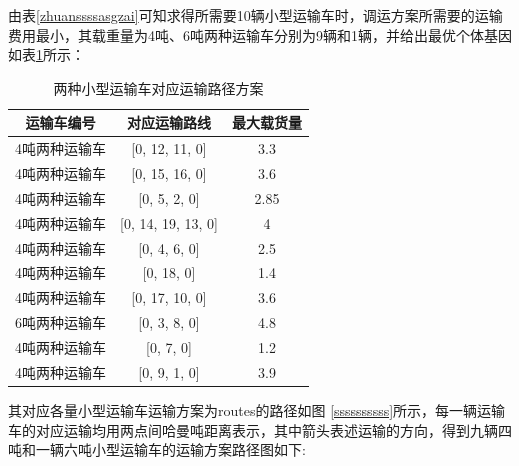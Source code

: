 \documentclass{whutmod}
\begin{document}
    由表\ref{zhuanssssasgzai}可知求得所需要10辆小型运输车时，调运方案所需要的运输费用最小，其载重量为4吨、6吨两种运输车分别为9辆和1辆，并给出最优个体基因如表\ref{zhuansssssassgzai}所示：
    
    

    \begin{table}[H]
    	
    	\centering		
    	\caption{两种小型运输车对应运输路径方案}\label{zhuansssssassgzai}
    	\begin{tabular}{ccc}
    		\toprule[2pt]
    		\multicolumn{1}{m{5cm}}{\centering 运输车编号}
    		& \multicolumn{1}{m{5cm}}{\centering 对应运输路线 }
    		&\multicolumn{1}{m{5cm}}{\centering 最大载货量}
    		\\
    		\midrule[1pt]
    		4吨两种运输车 & [0, 12, 11, 0]&3.3 \\ 
    		4吨两种运输车 &   [0, 15, 16, 0]& 3.6\\ 
    		4吨两种运输车 &  [0, 5, 2, 0]& 2.85\\ 
    		4吨两种运输车 &  [0, 14, 19, 13, 0]& 4\\ 
    		4吨两种运输车 &  [0, 4, 6, 0]&2.5\\ 
    		4吨两种运输车 &  [0, 18, 0] &1.4\\ 
    		4吨两种运输车 & [0, 17, 10, 0] &3.6\\ 
    		6吨两种运输车 &  [0, 3, 8, 0]&4.8\\ 
    		  4吨两种运输车 & [0, 7, 0]&1.2\\ 
    		4吨两种运输车 &   [0, 9, 1, 0]& 3.9\\ 
    		\bottomrule[2pt]	
    	\end{tabular}
    \end{table}
    
    其对应各量小型运输车运输方案为routes的路径如图 \ref{ssssssssss}所示，每一辆运输车的对应运输均用两点间哈曼吨距离表示，其中箭头表述运输的方向，得到九辆四吨和一辆六吨小型运输车的运输方案路径图如下:
    
\end{document}
